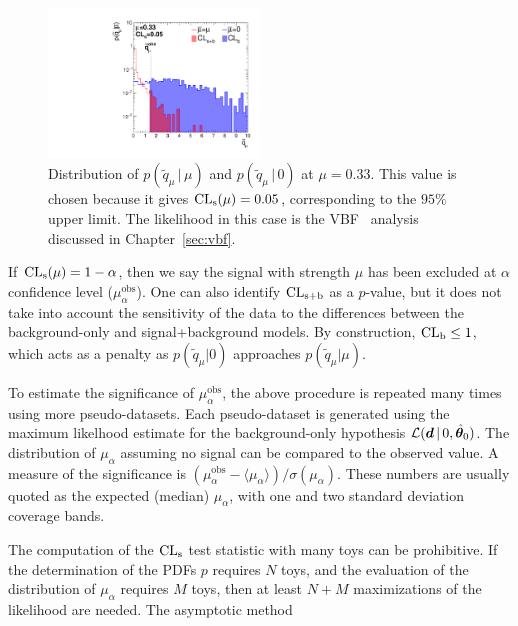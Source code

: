 \begin{figure}[]
    \begin{center}
        \includegraphics[width=0.5\textwidth]{figures/cls/cls.pdf}
        \caption{Distribution of $p(\tilde q_\mu\,|\,\mu)$ and $p(\tilde q_\mu\,|\,0)$ at $\mu = 0.33$. 
                 This value is chosen because it gives $\operatorname{\mathrm{CL}_s}(\mu) = 0.05$, corresponding to the $95\%$ upper limit.
                 The likelihood in this case is the VBF \hinv~analysis discussed in Chapter~\ref{sec:vbf}.}
        \label{fig:cls:cls}
    \end{center}
\end{figure}

If $\operatorname{\mathrm{CL}_s}(\mu) = 1-\alpha$, then we say the signal with strength $\mu$ has been excluded at $\alpha$ confidence level ($\mu_\alpha^\mathrm{obs}$).
One can also identify $\operatorname{\mathrm{CL}_{s+b}}$ as a $p$-value, but it does not take into account the sensitivity of the data to the differences between the background-only and signal+background models.
By construction, $\operatorname{\mathrm{CL}_b} \leq 1$, which acts as a penalty as $p(\tilde q_\mu | 0)$ approaches $p(\tilde q_\mu | \mu)$.

To estimate the significance of $\mu_\alpha^\mathrm{obs}$, the above procedure is repeated many times using more pseudo-datasets.
Each pseudo-dataset is generated using the maximum likelhood estimate for the background-only hypothesis $\mathcal{L}(\bm{d}\,|\,0,\hat{\bm{\theta}}_0)$.
The distribution of $\mu_\alpha$ assuming no signal can be compared to the observed value.
A measure of the significance is $(\mu_\alpha^\mathrm{obs} - \langle\mu_\alpha\rangle) / \sigma(\mu_\alpha)$.
These numbers are usually quoted as the expected (median) $\mu_\alpha$, with one and two standard deviation coverage bands.

The computation of the $\operatorname{\mathrm{CL}_s}$ test statistic with many toys can be prohibitive.
If the determination of the PDFs $p$ requires $N$ toys, and the evaluation of the distribution of $\mu_\alpha$ requires $M$ toys, then at least $N+M$ maximizations of the likelihood are needed.
The asymptotic method
